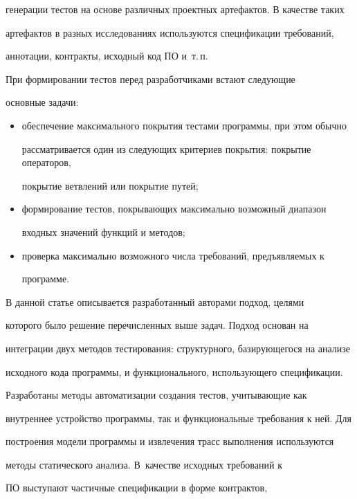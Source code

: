 генерации тес\-тов на основе различных проектных артефактов. В качестве таких


артефактов в разных исследованиях используются спецификации требований,


аннотации, контракты, исходный код ПО и~т.\,п.





     При формировании тестов перед разработчиками встают следующие


основные задачи:


     \begin{itemize}


\item обеспечение максимального покрытия тестами программы, при этом обычно


рассматривается один из следующих критериев покрытия: покрытие операторов,


покрытие ветвлений или покрытие путей;


\item формирование тестов, покрывающих максимально возможный диапазон


входных значений функций и методов;


\item проверка максимально возможного числа требований, предъявляемых к


программе.


\end{itemize}





     В данной статье описывается разработанный авторами подход, целями


которого было решение перечисленных выше задач. Подход основан на


интеграции двух методов тестирования: структурного, базирующегося на анализе


исходного кода программы, и функционального, использующего спецификации.


Разработаны методы автоматизации создания тестов, учитывающие как


внутреннее устройство программы, так и функциональные требования к ней. Для


построения модели программы и извлечения трасс выполнения используются


методы статического анализа. В~качестве исходных требований к


ПО выступают частичные спецификации в форме контрактов,


